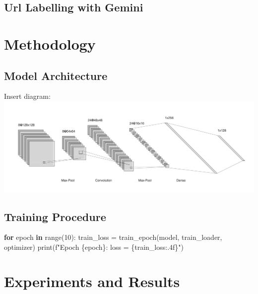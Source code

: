 \documentclass[
  titlepage]{article}
\newenvironment{Shaded}{\begin{snugshade}}{\end{snugshade}}
\newcommand{\BuiltInTok}[1]{\textcolor[rgb]{0.00,0.23,0.31}{#1}}
\newcommand{\ControlFlowTok}[1]{\textcolor[rgb]{0.00,0.23,0.31}{\textbf{#1}}}
\newcommand{\DecValTok}[1]{\textcolor[rgb]{0.68,0.00,0.00}{#1}}
\newcommand{\KeywordTok}[1]{\textcolor[rgb]{0.00,0.23,0.31}{\textbf{#1}}}
\newcommand{\NormalTok}[1]{\textcolor[rgb]{0.00,0.23,0.31}{#1}}
\newcommand{\OperatorTok}[1]{\textcolor[rgb]{0.37,0.37,0.37}{#1}}
\newcommand{\SpecialCharTok}[1]{\textcolor[rgb]{0.37,0.37,0.37}{#1}}
\newcommand{\SpecialStringTok}[1]{\textcolor[rgb]{0.13,0.47,0.30}{#1}}
\begin{document}
\subsection{Url Labelling with Gemini}\label{url-labelling-with-gemini}

\section{Methodology}\label{methodology}

\subsection{Model Architecture}\label{model-architecture}

Insert diagram:
\includegraphics[width=0.75\linewidth,height=\textheight,keepaspectratio]{figures/nn.png}

\subsection{Training Procedure}\label{training-procedure}

\begin{Shaded}
\begin{Highlighting}[]
\ControlFlowTok{for}\NormalTok{ epoch }\KeywordTok{in} \BuiltInTok{range}\NormalTok{(}\DecValTok{10}\NormalTok{):}
\NormalTok{    train\_loss }\OperatorTok{=}\NormalTok{ train\_epoch(model, train\_loader, optimizer)}
    \BuiltInTok{print}\NormalTok{(}\SpecialStringTok{f"Epoch }\SpecialCharTok{\{}\NormalTok{epoch}\SpecialCharTok{\}}\SpecialStringTok{: loss = }\SpecialCharTok{\{}\NormalTok{train\_loss}\SpecialCharTok{:.4f\}}\SpecialStringTok{"}\NormalTok{)}
\end{Highlighting}
\end{Shaded}

\section{Experiments and Results}\label{experiments-and-results}
\end{document}
